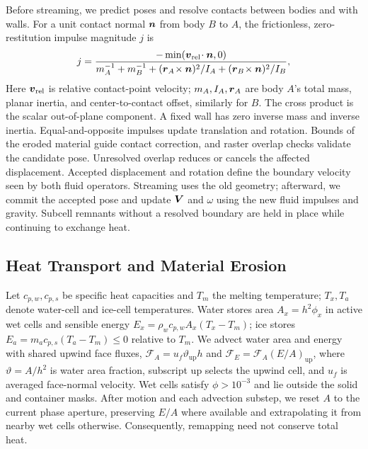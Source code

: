 Before streaming, we predict poses and resolve contacts between bodies
and with walls. For a unit contact normal $\boldsymbol{n}$ from body $B$ to $A$,
the frictionless, zero-restitution impulse magnitude $j$ is
\begin{equation}
      j=\frac{-\min(\boldsymbol{v}_{\mathrm{rel}}\!\cdot\boldsymbol{n},0)}
      {m_A^{-1}+m_B^{-1}+
            (\boldsymbol{r}_A\!\times\boldsymbol{n})^2/I_A+
            (\boldsymbol{r}_B\!\times\boldsymbol{n})^2/I_B},
      \label{eq:contact}
\end{equation}
Here $\boldsymbol{v}_{\mathrm{rel}}$ is relative contact-point velocity;
$m_A,I_A,\boldsymbol{r}_A$ are body $A$'s total mass, planar inertia, and
center-to-contact offset, similarly for $B$. The cross product is the
scalar out-of-plane component. A fixed wall has zero inverse mass and inverse inertia.
Equal-and-opposite impulses update translation and rotation.
Bounds of the eroded material guide contact
correction, and raster overlap checks validate the candidate pose.
Unresolved overlap reduces or cancels the affected displacement.
Accepted displacement and rotation define the boundary velocity seen
by both fluid operators. Streaming uses the old geometry; afterward,
we commit the accepted pose and update $\boldsymbol{V}$ and $\omega$ using the
new fluid impulses and gravity. Subcell remnants without a resolved
boundary are held in place while continuing to exchange heat.

\subsection{Heat Transport and Material Erosion}
\label{sec:thermal}
Let $c_{p,w},c_{p,s}$ be specific heat capacities and $T_m$ the melting
temperature; $T_x,T_a$ denote water-cell and ice-cell temperatures.
Water stores area $A_x=h^2\phi_x$ in active wet cells and sensible energy
$E_x=\rho_wc_{p,w} A_x(T_x-T_m)$; ice stores
$E_a=m_ac_{p,s}(T_a-T_m)\le0$ relative to $T_m$.
We advect water area and energy with shared upwind face fluxes,
$\mathcal F_A=u_f\vartheta_{\mathrm{up}}h$ and
$\mathcal F_E=\mathcal F_A(E/A)_{\mathrm{up}}$, where
$\vartheta=A/h^2$ is water area fraction, subscript $\mathrm{up}$ selects
the upwind cell, and $u_f$ is averaged face-normal velocity. Wet cells satisfy
$\phi>10^{-3}$ and lie outside the solid and container masks.
After motion and each advection substep, we reset $A$ to the current phase
aperture, preserving $E/A$ where available and extrapolating it from nearby
wet cells otherwise. Consequently, remapping need not conserve total heat.

